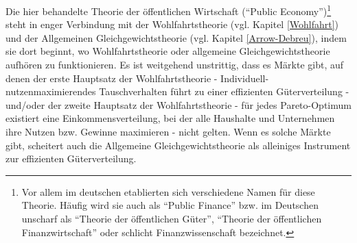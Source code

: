 Die hier behandelte Theorie der öffentlichen Wirtschaft ("`Public Economy"')\footnote{Vor allem im deutschen etablierten sich verschiedene Namen für diese Theorie. Häufig wird sie auch als "`Public Finance"' bzw. im Deutschen unscharf als "`Theorie der öffentlichen Güter"', "`Theorie der öffentlichen Finanzwirtschaft"' oder schlicht Finanzwissenschaft bezeichnet.} steht in enger Verbindung mit der Wohlfahrtstheorie (vgl. Kapitel \ref{Wohlfahrt}) und der Allgemeinen Gleichgewichtstheorie (vgl. Kapitel \ref{Arrow-Debreu}), indem sie dort beginnt, wo Wohlfahrtstheorie oder allgemeine Gleichgewichtstheorie aufhören zu funktionieren. Es ist weitgehend unstrittig, dass es Märkte gibt, auf denen der erste Hauptsatz der Wohlfahrtstheorie - Individuell-nutzenmaximierendes Tauschverhalten führt zu einer effizienten Güterverteilung - und/oder der zweite Hauptsatz der Wohlfahrtstheorie - für jedes Pareto-Optimum existiert eine Einkommensverteilung, bei der alle Haushalte und Unternehmen ihre Nutzen bzw. Gewinne maximieren - nicht gelten. Wenn es solche Märkte gibt, scheitert auch die Allgemeine Gleichgewichtstheorie als alleiniges Instrument zur effizienten Güterverteilung.
